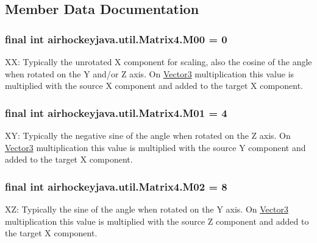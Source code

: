 \subsection{Member Data Documentation}
\hypertarget{classairhockeyjava_1_1util_1_1_matrix4_a66aa09dd1f4eeec707922eafd3e6fd7c}{}
\subsubsection[{M00}]{\setlength{\rightskip}{0pt plus 5cm}final int airhockeyjava.\+util.\+Matrix4.\+M00 = 0\hspace{0.3cm}{\ttfamily [static]}}\label{classairhockeyjava_1_1util_1_1_matrix4_a66aa09dd1f4eeec707922eafd3e6fd7c}
X\+X\+: Typically the unrotated X component for scaling, also the cosine of the angle when rotated on the Y and/or Z axis. On \hyperlink{classairhockeyjava_1_1util_1_1_vector3}{Vector3} multiplication this value is multiplied with the source X component and added to the target X component. \hypertarget{classairhockeyjava_1_1util_1_1_matrix4_a79d141c5badf62e62eb5b9b9ec0bab47}{}
\subsubsection[{M01}]{\setlength{\rightskip}{0pt plus 5cm}final int airhockeyjava.\+util.\+Matrix4.\+M01 = 4\hspace{0.3cm}{\ttfamily [static]}}\label{classairhockeyjava_1_1util_1_1_matrix4_a79d141c5badf62e62eb5b9b9ec0bab47}
X\+Y\+: Typically the negative sine of the angle when rotated on the Z axis. On \hyperlink{classairhockeyjava_1_1util_1_1_vector3}{Vector3} multiplication this value is multiplied with the source Y component and added to the target X component. \hypertarget{classairhockeyjava_1_1util_1_1_matrix4_a966bb97b392769730cde5c5415549bc2}{}
\subsubsection[{M02}]{\setlength{\rightskip}{0pt plus 5cm}final int airhockeyjava.\+util.\+Matrix4.\+M02 = 8\hspace{0.3cm}{\ttfamily [static]}}\label{classairhockeyjava_1_1util_1_1_matrix4_a966bb97b392769730cde5c5415549bc2}
X\+Z\+: Typically the sine of the angle when rotated on the Y axis. On \hyperlink{classairhockeyjava_1_1util_1_1_vector3}{Vector3} multiplication this value is multiplied with the source Z component and added to the target X component. \hypertarget{classairhockeyjava_1_1util_1_1_matrix4_a0da4a8966b37ffa3f11a1a7a7c52feea}{}

